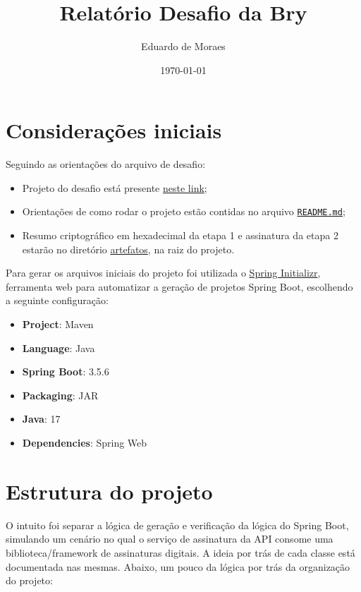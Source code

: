 \documentclass{article}
\title{Relatório Desafio da Bry}
\author{Eduardo de Moraes}
\date{\today}
\begin{document}
    \maketitle

    \section{Considerações iniciais}

    Seguindo as orientações do arquivo de desafio:

    \begin{itemize}
        \item Projeto do desafio está presente \href{https://github.com/homerico/desafio_bry}{neste link};
        \item Orientações de como rodar o projeto estão contidas no arquivo \href{https://github.com/homerico/desafio_bry/blob/main/README.md}{\texttt{README.md}};
        \item Resumo criptográfico em hexadecimal da etapa 1 e assinatura da etapa 2 estarão no diretório \href{https://github.com/homerico/desafio_bry/tree/main/artefatos}{artefatos}, na raiz do projeto.
    \end{itemize}

    Para gerar os arquivos iniciais do projeto foi utilizada o \href{https://start.spring.io/}{Spring Initializr}, ferramenta web para automatizar a geração de projetos Spring Boot, escolhendo a seguinte configuração:

    \begin{itemize}
        \item \textbf{Project}: Maven
        \item \textbf{Language}: Java
        \item \textbf{Spring Boot}: 3.5.6
        \item \textbf{Packaging}: JAR
        \item \textbf{Java}: 17
        \item \textbf{Dependencies}: Spring Web
    \end{itemize}

    \newpage

    \section{Estrutura do projeto}

    O intuito foi separar a lógica de geração e verificação da lógica do Spring Boot, simulando um cenário no qual o serviço de assinatura da API consome uma biblioteca/framework de assinaturas digitais. A ideia por trás de cada classe está documentada nas mesmas. Abaixo, um pouco da lógica por trás da organização do projeto:
\end{document}
